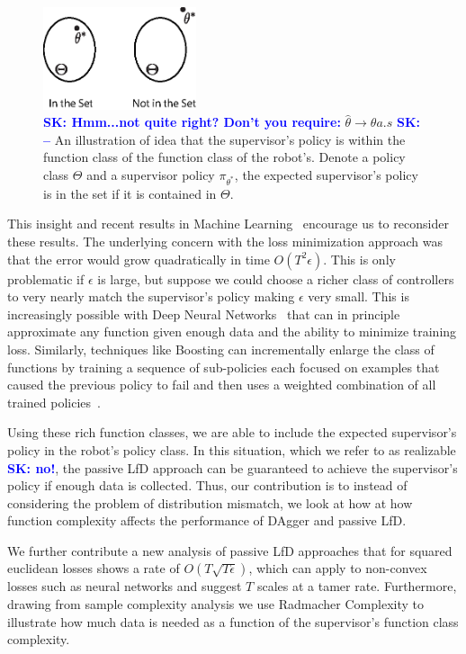 \documentclass[10pt, conference]{ieeeconf}      %
\newcommand{\sknote}[1]{\ifthenelse{ \boolean{include-notes}}%
 {\textcolor{blue}{\textbf{SK: #1}}}{}}
\begin{document}
\begin{figure}
\center
\includegraphics[width=0.4\textwidth]{f_figs/realizibility.eps}
\caption{
    \footnotesize
    \sknote{Hmm...not quite right? Don't you require:} $\hat{\theta} \rightarrow \theta a.s$ \sknote{--}
An illustration of idea that the supervisor's policy is within the function class of the function class of the robot's. Denote a policy class $\Theta$ and a supervisor policy $\pi_{\theta^*}$, the expected supervisor's policy is in the set if it is contained in $\Theta$.
}
\vspace*{-20pt}
\label{fig:teaserl}
\end{figure}


This insight and recent results in Machine Learning~\cite{krizhevsky2012imagenet} encourage us to reconsider these results. The underlying concern with the loss minimization approach was that the error would grow quadratically in time $O(T^2\epsilon)$. This is only problematic if $\epsilon$ is large, but suppose we could choose a richer class of controllers to very nearly match the supervisor’s policy making $\epsilon$ very small. This is increasingly possible with Deep Neural Networks~\cite{anthony2009neural} that can in principle approximate any function given enough data and the ability to minimize training loss. Similarly, techniques like Boosting can incrementally enlarge the class of functions by training a sequence of sub-policies each focused on examples that caused the previous policy to fail and then uses a weighted combination of all trained policies~\cite{mason1999boosting}.

Using these rich function classes, we are able to include the expected supervisor's policy in the robot's policy class. In this situation, which we refer to as realizable\sknote{no!}, the passive LfD approach can be guaranteed to achieve the supervisor's policy if enough data is collected. Thus, our contribution is to instead of considering the problem of distribution mismatch, we look at how at how function complexity affects the performance of DAgger and passive LfD. 


We further contribute a new analysis of passive LfD approaches that for squared euclidean losses shows a rate of $O(T\sqrt{T\epsilon})$, which can apply to non-convex losses such as neural networks and suggest $T$ scales at a tamer rate. Furthermore, drawing from sample complexity analysis we use Radmacher Complexity to illustrate how much data is needed as a function of the supervisor's function class complexity. 
\end{document}
